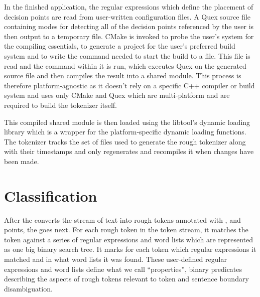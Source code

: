 In the finished application, the regular expressions which define the placement
of decision points are read from user-written configuration files. A Quex
source file containing modes for detecting all of the decision points
referenced by the user is then output to a temporary file. CMake
\cite{web-cmake} is invoked to probe the user's system for the compiling
essentials, to generate a project for the user's preferred build system and to
write the command needed to start the build to a file. This file is read and
the command within it is run, which executes Quex on the generated source file
and then compiles the result into a shared module. This process is therefore
platform-agnostic as it doesn't rely on a specific C++ compiler or build system
and uses only CMake and Quex which are multi-platform and are required to build
the tokenizer itself.

This compiled shared module is then loaded using the libtool's dynamic loading
library \cite{web-libtool} which is a wrapper for the platform-specific dynamic
loading functions. The tokenizer tracks the set of files used to generate the
rough tokenizer along with their timestamps and only regenerates and recompiles
it when changes have been made.

\section{Classification}

After the  converts the stream of text into rough tokens
annotated with \maysplit{}, \mayjoin{} and \maybreaksentence{} points, the
 goes next. For each rough token in the token stream,
it matches the token against a series of regular expressions and word lists
which are represented as one big binary search tree. It marks for each token
which regular expressions it matched and in what word lists it was found. These
user-defined regular expressions and word lists define what we call
``properties'', binary predicates describing the aspects of rough tokens
relevant to token and sentence boundary disambiguation.

